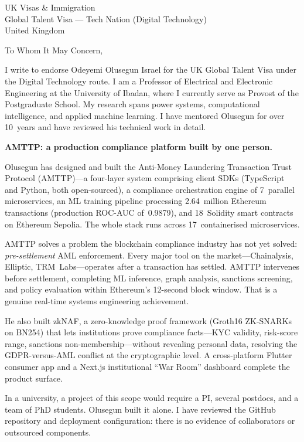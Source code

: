 \documentclass[12pt,a4paper]{letter}
\date{6 March 2026}
\begin{document}
\begin{letter}{UK Visas \& Immigration\\
Global Talent Visa --- Tech Nation (Digital Technology)\\
United Kingdom}

\opening{To Whom It May Concern,}

I write to endorse Odeyemi Olusegun Israel for the UK Global Talent Visa
under the Digital Technology route.  I am a Professor of Electrical and
Electronic Engineering at the University of Ibadan, where I currently
serve as Provost of the Postgraduate School.  My research spans power
systems, computational intelligence, and applied machine learning.  I
have mentored Olusegun for over 10~years and have reviewed his technical
work in detail.


\textbf{AMTTP: a production compliance platform built by one person.}

Olusegun has designed and built the Anti-Money Laundering Transaction
Trust Protocol (AMTTP)---a four-layer system comprising client SDKs
(TypeScript and Python, both open-sourced), a compliance orchestration
engine of 7~parallel microservices, an ML training pipeline processing
2.64~million Ethereum transactions (production ROC-AUC of~0.9879), and
18~Solidity smart contracts on Ethereum Sepolia.  The whole stack runs
across 17~containerised microservices.

AMTTP solves a problem the blockchain compliance industry has not yet
solved: \textit{pre-settlement} AML enforcement.  Every major tool on
the market---Chainalysis, Elliptic, TRM~Labs---operates after a
transaction has settled.  AMTTP intervenes before settlement, completing
ML inference, graph analysis, sanctions screening, and policy evaluation
within Ethereum's 12-second block window.  That is a genuine real-time
systems engineering achievement.

He also built zkNAF, a zero-knowledge proof framework (Groth16
ZK-SNARKs on BN254) that lets institutions prove compliance facts---KYC
validity, risk-score range, sanctions non-membership---without revealing
personal data, resolving the GDPR-versus-AML conflict at the
cryptographic level.  A cross-platform Flutter consumer app and a
Next.js institutional ``War Room'' dashboard complete the product
surface.

In a university, a project of this scope would require a PI, several
postdocs, and a team of PhD students.  Olusegun built it alone.  I have
reviewed the GitHub repository and deployment configuration: there is no
evidence of collaborators or outsourced components.


\end{letter}
\end{document}
